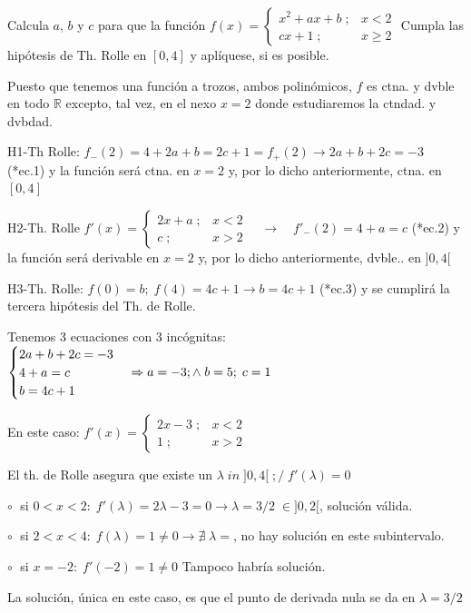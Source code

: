 	\begin{ejre} Calcula $a$, $b$ y $c$ para que la función $f(x)= \begin{cases}
		x^2+ax+b \; ;&  x<2 \\
		cx+1 \; ;& x\ge2
		\end{cases}$ Cumpla las hipótesis de Th. Rolle en $[0,4]$ y aplíquese, si es posible.
		
	\end{ejre}
	\begin{proofw}\renewcommand{\qedsymbol}{$\diamond$}	
		
		Puesto que tenemos una función a trozos, ambos polinómicos, $f$ es ctna. y dvble en todo $\mathbb R$ excepto, tal vez, en el nexo $x=2$ donde estudiaremos la ctndad. y dvbdad.
		
		H1-Th Rolle: $f_-(2)=4+2a+b=2c+1=f_+(2) \to 2a+b+2c=-3$ (*ec.1) y la función será ctna. en $x=2$ y, por lo dicho anteriormente, ctna. en $[0,4]$
		
		H2-Th. Rolle $f'(x)= \begin{cases}
		2x+a \; ;&  x<2 \\
		c \; ;& x>2
		\end{cases} \quad \to \quad f'_-(2)=4+a=c$ (*ec.2) y la función será derivable en $x=2$ y, por lo dicho anteriormente, dvble.. en $]0,4[$
		
		H3-Th. Rolle: $f(0)=b; \; f(4)=4c+1 \to b=4c+1$ (*ec.3) y se cumplirá la tercera hipótesis del Th. de Rolle.
		
		Tenemos 3 ecuaciones con 3 incógnitas: $\begin{cases}
			2a+b+2c=-3 \\
			4+a=c \\
			b=4c+1
			\end{cases} \Rightarrow \small{a=-3; \wedge \; b=5; \; c=1}$
			
		En este caso: $f'(x)= \begin{cases}
		2x-3 \; ;&  x<2 \\
		1 \; ;& x>2
		\end{cases}$ 
		
		El th. de Rolle asegura que existe un $\lambda \; in \; ]0,4[\; ; / \; f'(\lambda)=0$
		
		$\circ \;$ si $0<x<2:\; f'(\lambda)=2\lambda-3=0 \to \lambda=3/2 \; \in ]0,2[$, solución válida.
		
		$\circ \;$ si $2 < x < 4 : \; f(\lambda)=1 \neq 0 \to \nexists \; \lambda=$, no hay solución en este subintervalo.
		
		$\circ \;$ si $x=-2:\; f'(-2)=1\neq 0$ Tampoco habría solución.
		
		La solución, única en este caso, es que el punto de derivada nula se da en $\lambda=3/2$		
		
	\end{proofw}
	
